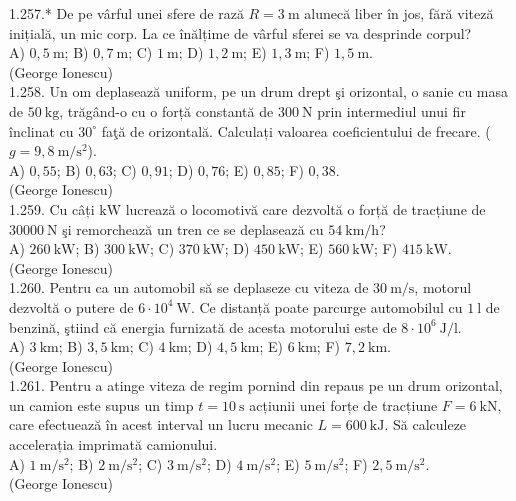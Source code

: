 1.257.* De pe vârful unei sfere de rază $R=3 \mathrm{~m}$ alunecă liber în jos, fără viteză inițială, un mic corp. La ce înălțime de vârful sferei se va desprinde corpul?\\ A) $0,5 \mathrm{~m}$; B) $0,7 \mathrm{~m}$; C) $1 \mathrm{~m}$; D) $1,2 \mathrm{~m}$; E) $1,3 \mathrm{~m}$; F) $1,5 \mathrm{~m}$.\\ (George Ionescu)\\

1.258. Un om deplasează uniform, pe un drum drept şi orizontal, o sanie cu masa de $50 \mathrm{~kg}$, trăgând-o cu o forță constantă de $300 \mathrm{~N}$ prin intermediul unui fir înclinat cu $30^{\circ}$ faţă de orizontală. Calculați valoarea coeficientului de frecare. ($g=9,8 \mathrm{~m} / \mathrm{s}^{2}$).\\ A) $0,55$; B) $0,63$; C) $0,91$; D) $0,76$; E) $0,85$; F) $0,38$.\\ (George Ionescu)\\

1.259. Cu câți $\mathrm{kW}$ lucrează o locomotivă care dezvoltă o forță de tracțiune de $30000 \mathrm{~N}$ şi remorchează un tren ce se deplasează cu $54 \mathrm{~km} / \mathrm{h}$?\\ A) $260 \mathrm{~kW}$; B) $300 \mathrm{~kW}$; C) $370 \mathrm{~kW}$; D) $450 \mathrm{~kW}$; E) $560 \mathrm{~kW}$; F) $415 \mathrm{~kW}$.\\ (George Ionescu)\\

1.260. Pentru ca un automobil să se deplaseze cu viteza de $30 \mathrm{~m} / \mathrm{s}$, motorul dezvoltă o putere de $6 \cdot 10^{4} \mathrm{~W}$. Ce distanță poate parcurge automobilul cu $1 \mathrm{~l}$ de benzină, ştiind că energia furnizată de acesta motorului este de $8 \cdot 10^{6} \mathrm{~J} / \mathrm{l}$.\\ A) $3 \mathrm{~km}$; B) $3,5 \mathrm{~km}$; C) $4 \mathrm{~km}$; D) $4,5 \mathrm{~km}$; E) $6 \mathrm{~km}$; F) $7,2 \mathrm{~km}$.\\ (George Ionescu)\\

1.261. Pentru a atinge viteza de regim pornind din repaus pe un drum orizontal, un camion este supus un timp $t=10 \mathrm{~s}$ acțiunii unei forțe de tracțiune $F=6 \mathrm{~kN}$, care efectuează în acest interval un lucru mecanic $L=600 \mathrm{~kJ}$. Să calculeze accelerația imprimată camionului.\\ A) $1 \mathrm{~m} / \mathrm{s}^{2}$; B) $2 \mathrm{~m} / \mathrm{s}^{2}$; C) $3 \mathrm{~m} / \mathrm{s}^{2}$; D) $4 \mathrm{~m} / \mathrm{s}^{2}$; E) $5 \mathrm{~m} / \mathrm{s}^{2}$; F) $2,5 \mathrm{~m} / \mathrm{s}^{2}$.\\ (George Ionescu)\\

